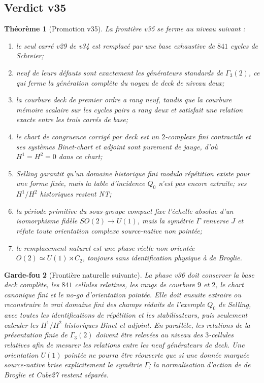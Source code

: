 \documentclass[11pt,a4paper]{article}
\newtheorem{theorem}{Théorème}[section]
\newtheorem{guardrail}[theorem]{Garde-fou}
\begin{document}
\subsection{Verdict v35}

\begin{theorem}[Promotion v35]\label{thm:v35-verdict}
La fronti\`ere v35 se ferme au niveau suivant :
\begin{enumerate}[label=\textup{(\roman*)}]
\item le seul carr\'e v29 de v34 est remplac\'e par une base exhaustive de $841$ cycles de Schreier;
\item neuf de leurs d\'efauts sont exactement les g\'en\'erateurs standards de $\Gamma_3(2)$, ce qui
ferme la g\'en\'eration compl\`ete du noyau de deck de niveau deux;
\item la courbure deck de premier ordre a rang neuf, tandis que la courbure m\'emoire scalaire
sur les cycles pairs a rang deux et satisfait une relation exacte entre les trois carr\'es de base;
\item le chart de congruence corrig\'e par deck est un $2$-complexe fini contractile et ses syst\`emes
Binet-chart et adjoint sont purement de jauge, d'o\`u $H^1=H^2=0$ dans ce chart;
\item Selling garantit qu'un domaine historique fini modulo r\'ep\'etition existe pour une forme
fix\'ee, mais la table d'incidence $Q_0$ n'est pas encore extraite; ses $H^1/H^2$ historiques restent NT;
\item la p\'eriode primitive du sous-groupe compact fixe l'\'echelle absolue d'un isomorphisme fid\`ele
$SO(2)\to U(1)$, mais la sym\'etrie $\Gamma$ renverse $J$ et r\'efute toute orientation complexe
source-native non point\'ee;
\item le remplacement naturel est une phase r\'eelle non orient\'ee
$O(2)\simeq U(1)\rtimes C_2$, toujours sans identification physique \`a de Broglie.
\end{enumerate}
\end{theorem}

\begin{guardrail}[Fronti\`ere naturelle suivante]
La phase v36 doit conserver la base deck compl\`ete, les $841$ cellules relatives, les rangs de
courbure $9$ et $2$, le chart canonique fini et le no-go d'orientation point\'ee. Elle doit ensuite
extraire ou reconstruire le \emph{vrai} domaine fini des champs r\'eduits de l'exemple $Q_0$ de
Selling, avec toutes les identifications de r\'ep\'etition et les stabilisateurs, puis seulement calculer
les $H^1/H^2$ historiques Binet et adjoint. En parall\`ele, les relations de la pr\'esentation finie de
$\Gamma_3(2)$ doivent \^etre relev\'ees au niveau des $3$-cellules relatives afin de mesurer les
relations entre les neuf g\'en\'erateurs de deck. Une orientation $U(1)$ point\'ee ne pourra \^etre
r\'eouverte que si une donn\'ee marqu\'ee source-native brise explicitement la sym\'etrie $\Gamma$;
la normalisation d'action de de Broglie et Cube27 restent s\'epar\'es.
\end{guardrail}
\end{document}
